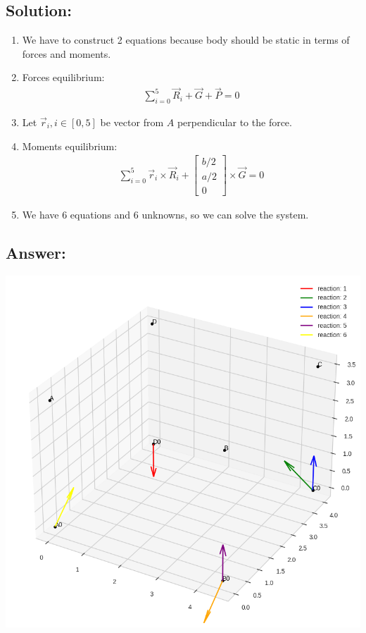 \subsection*{Solution:}

\begin{enumerate}
    \item We have to construct 2 equations because body should be static
          in terms of forces and moments.
    \item Forces equilibrium:
          \begin{align}
              \sum_{i=0}^5 \vec{R}_i + \vec{G} + \vec{P}= 0
          \end{align}
    \item Let $\vec{r}_i, i \in [0, 5]$ be vector from $A$ perpendicular to the force.
    \item Moments equilibrium:
          \begin{align}
              \sum_{i=0}^5 \vec{r}_i \times \vec{R}_i + \begin{bmatrix}
                  b/2 \\ a/2 \\ 0
              \end{bmatrix} \times \vec{G} = 0
          \end{align}
    \item We have 6 equations and 6 unknowns, so we can solve the system.
\end{enumerate}

\subsection*{Answer:}

\includegraphics[width=\linewidth]{task2.png}

